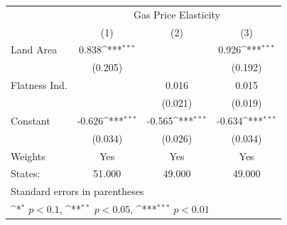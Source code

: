 {
\def\sym#1{\ifmmode^{#1}\else\(^{#1}\)\fi}
\begin{tabular}{l*{3}{c}}
\hline\hline
            &\multicolumn{3}{c}{Gas Price Elasticity}                         \\
            &\multicolumn{1}{c}{(1)}         &\multicolumn{1}{c}{(2)}         &\multicolumn{1}{c}{(3)}         \\
\hline
Land Area   &       0.838\sym{***}&                     &       0.926\sym{***}\\
            &     (0.205)         &                     &     (0.192)         \\
[1em]
Flatness Ind.&                     &       0.016         &       0.015         \\
            &                     &     (0.021)         &     (0.019)         \\
[1em]
Constant    &      -0.626\sym{***}&      -0.565\sym{***}&      -0.634\sym{***}\\
            &     (0.034)         &     (0.026)         &     (0.034)         \\
\hline
Weights     &         Yes         &         Yes         &         Yes         \\
States:     &      51.000         &      49.000         &      49.000         \\
\hline\hline
\multicolumn{4}{l}{\footnotesize Standard errors in parentheses}\\
\multicolumn{4}{l}{\footnotesize \sym{*} \(p<0.1\), \sym{**} \(p<0.05\), \sym{***} \(p<0.01\)}\\
\end{tabular}
}

